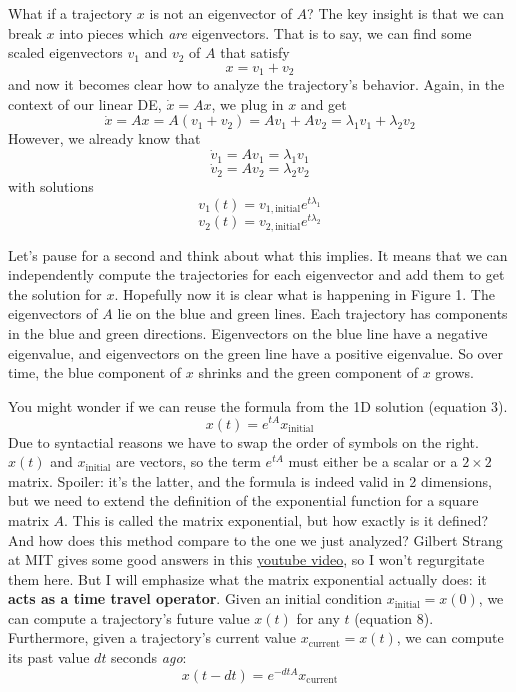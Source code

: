 \documentclass[11pt, oneside]{article}   	%
\begin{document}
What if a trajectory $x$ is not an eigenvector of $A$?
The key insight is that we can break $x$ into pieces which \textit{are} eigenvectors.
That is to say, we can find some scaled eigenvectors $v_1$ and $v_2$ of $A$ that satisfy
\begin{equation}
x = v_1 + v_2
\end{equation}
and now it becomes clear how to analyze the trajectory's behavior.
Again, in the context of our linear DE, $\dot{x} = Ax$, we plug in $x$ and get
\begin{equation}
\dot{x} = Ax
= A(v_1 + v_2)
= A v_1 + A v_2
= \lambda_1 v_1 + \lambda_2 v_2
\end{equation}
However, we already know that
$$ \dot{v}_1 = A v_1 = \lambda_1 v_1 $$
$$ \dot{v}_2 = A v_2 = \lambda_2 v_2 $$
with solutions
$$ v_1(t) = v_{1,\mathrm{initial}} e^{t\lambda_1} $$
$$ v_2(t) = v_{2,\mathrm{initial}} e^{t\lambda_2} $$

Let's pause for a second and think about what this implies.
It means that we can independently compute the trajectories for each eigenvector and add them to get the solution for $x$.
Hopefully now it is clear what is happening in Figure 1.
The eigenvectors of $A$ lie on the blue and green lines.
Each trajectory has components in the blue and green directions.
Eigenvectors on the blue line have a negative eigenvalue, and eigenvectors on the green line have a positive eigenvalue.
So over time, the blue component of $x$ shrinks and the green component of $x$ grows.

You might wonder if we can reuse the formula from the 1D solution (equation 3).
\begin{equation}
x(t) = e^{tA} x_\mathrm{initial}
\end{equation}
Due to syntactial reasons we have to swap the order of symbols on the right.
$x(t)$ and $x_\mathrm{initial}$ are vectors, so the term $e^{tA}$ must either be a scalar or a $2\times 2$ matrix.
Spoiler: it's the latter, and the formula is indeed valid in 2 dimensions,
but we need to extend the definition of the exponential function for a square matrix $A$.
This is called the matrix exponential, but how exactly is it defined?
And how does this method compare to the one we just analyzed?
Gilbert Strang at MIT gives some good answers in this \href{https://youtu.be/LwSk9M5lJx4}{youtube video},
so I won't regurgitate them here.
But I will emphasize what the matrix exponential actually does: it \textbf{acts as a time travel operator}.
Given an initial condition $x_\mathrm{initial} = x(0)$, we can compute a trajectory's future value $x(t)$ for any $t$ (equation 8).
Furthermore, given a trajectory's current value $x_\mathrm{current} = x(t)$, we can compute its past value $dt$ seconds \textit{ago}:
\begin{equation}
x(t-dt) = e^{-dtA} x_\mathrm{current}
\end{equation}
\end{document}
